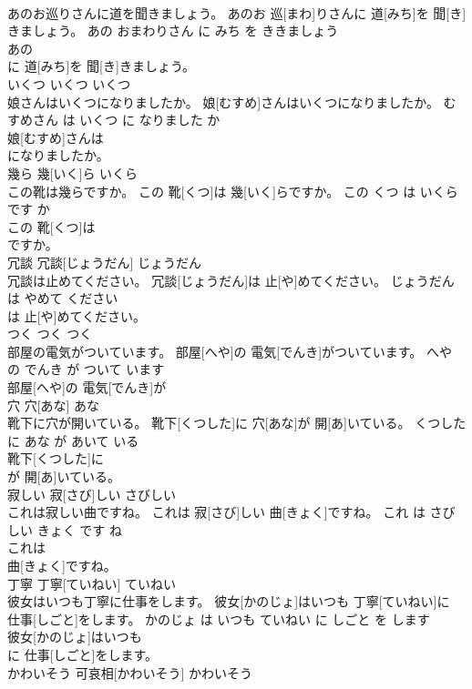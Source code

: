 \documentclass[8pt]{extreport}
\begin{document}
\begin{CJK}{UTF8}{min}
\\	あのお巡りさんに道を聞きましょう。	あのお 巡[まわ]りさんに 道[みち]を 聞[き]きましょう。	あの おまわりさん に みち を ききましょう	
\\	あの
\\	に 道[みち]を 聞[き]きましょう。		
\\	いくつ	いくつ	いくつ	
\\	娘さんはいくつになりましたか。	娘[むすめ]さんはいくつになりましたか。	むすめさん は いくつ に なりました か	
\\	娘[むすめ]さんは
\\	になりましたか。		
\\	幾ら	幾[いく]ら	いくら	
\\	この靴は幾らですか。	この 靴[くつ]は 幾[いく]らですか。	この くつ は いくら です か	
\\	この 靴[くつ]は
\\	ですか。		
\\	冗談	冗談[じょうだん]	じょうだん	
\\	冗談は止めてください。	冗談[じょうだん]は 止[や]めてください。	じょうだん は やめて ください	
\\	は 止[や]めてください。		
\\	つく	つく	つく	
\\	部屋の電気がついています。	部屋[へや]の 電気[でんき]がついています。	へや の でんき が ついて います	
\\	部屋[へや]の 電気[でんき]が
\\	穴	穴[あな]	あな	
\\	靴下に穴が開いている。	靴下[くつした]に 穴[あな]が 開[あ]いている。	くつした に あな が あいて いる	
\\	靴下[くつした]に
\\	が 開[あ]いている。		
\\	寂しい	寂[さび]しい	さびしい	
\\	これは寂しい曲ですね。	これは 寂[さび]しい 曲[きょく]ですね。	これ は さびしい きょく です ね	
\\	これは
\\	曲[きょく]ですね。		
\\	丁寧	丁寧[ていねい]	ていねい	
\\	彼女はいつも丁寧に仕事をします。	彼女[かのじょ]はいつも 丁寧[ていねい]に 仕事[しごと]をします。	かのじょ は いつも ていねい に しごと を します	
\\	彼女[かのじょ]はいつも
\\	に 仕事[しごと]をします。		
\\	かわいそう	可哀相[かわいそう]	かわいそう	

\end{CJK}
\end{document}
